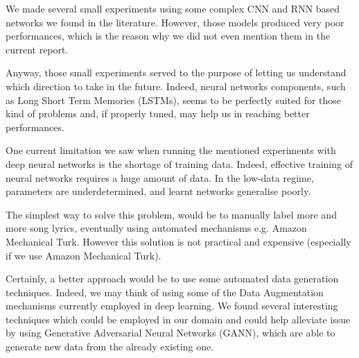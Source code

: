 We made several small experiments using some complex CNN and RNN based networks
we found in the literature\cite{text-emotion-classification}. However, those models produced very poor performances,
which is the reason why we did not even mention them in the current report.

Anyway, those small experiments served to the purpose of letting us understand 
which direction to take in the future. Indeed, neural networks components, such as
Long Short Term Memories (LSTMs), seems to be perfectly suited for those kind of problems
and, if properly tuned, may help us in reaching better performances.

One current limitation we saw when running the mentioned experiments with deep neural
networks is the shortage of training data. Indeed, effective training of 
neural networks requires a huge amount of data. In the low-data regime, parameters 
are underdetermined, and learnt networks generalise poorly. 

The simplest way to solve this problem, would be to manually label more and more song lyrics, eventually using
automated mechanisms e.g. Amazon Mechanical Turk\cite{amazon-turk}. However this solution is not practical
and expensive (especially if we use Amazon Mechanical Turk).

Certainly, a better approach would be to use some automated data generation techniques.
Indeed, we may think of using some of the Data Augmentation mechanisms currently employed in deep learning. 
We found several interesting techniques\cite{DBLP:journals/corr/abs-1711-00648} which could be employed in our domain
and could help alleviate issue by using Generative Adversarial Neural Networks (GANN), which
are able to generate new data from the already existing one.
